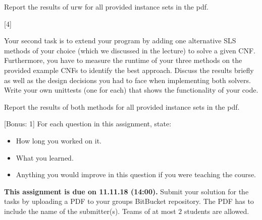 \documentclass{exam}
\newcommand{\duedate}{11.11.18 (14:00)}
\newcommand{\due}{{\bf This assignment is due on \duedate.} }
\begin{document}
\begin{questions}
		Report the results of urw for all provided instance sets in the pdf.
		
		[4]
		
		Your second task is to extend your program by adding one alternative SLS methods of your choice (which we discussed in the lecture) to solve a given CNF. Furthermore, you have to measure the runtime of your three methods on the provided example CNFs to identify the best approach. Discuss the results briefly as well as the design decisions you had to face when implementing both solvers.\\
		Write your own unittests (one for each) that shows the functionality of your code.
		
		Report the results of both methods for all provided instance sets in the pdf.
		
		[Bonus: 1]
		For each question in this assignment, state:
		\begin{itemize}
			\item How long you worked on it.
			\item What you learned.
			\item Anything you would improve in this question if you were teaching the course.
		\end{itemize}
	\end{questions}
	
	\noindent
	\due Submit your solution for the tasks by uploading a PDF to your groups BitBucket repository. The PDF has to include the name of the submitter(s). Teams of at most $2$ students are allowed.
\end{document}
